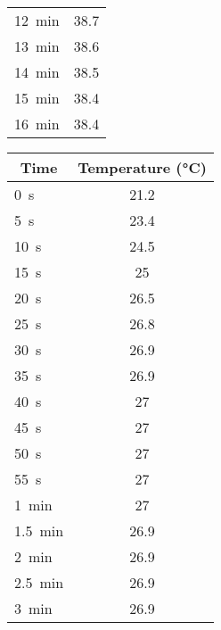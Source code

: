 \documentclass[11pt, titlepage]{article}
\begin{document}
\begin{center}
\begin{minipage}[t]{2in}
\begin{tabular}{l c}
                    \SI{12}{\minute} & 38.7 \\
                    \SI{13}{\minute} & 38.6 \\
                    \SI{14}{\minute} & 38.5 \\
                    \SI{15}{\minute} & 38.4 \\
                    \SI{16}{\minute} & 38.4 \\
                    \bottomrule
                \end{tabular}
            \end{minipage}
            \hspace{8pt}
            \begin{minipage}[t]{2in}
                \centering
                \label{tab:raw-partC}
                \begin{tabular}{l c}
                    \toprule
                    \multicolumn{1}{c}{Time} & Temperature (\si{\degreeCelsius}) \\
                    \midrule
                    \SI{0}{\second} & 21.2 \\
                    \SI{5}{\second} & 23.4 \\
                    \SI{10}{\second} & 24.5 \\
                    \SI{15}{\second} & 25 \\
                    \SI{20}{\second} & 26.5 \\
                    \SI{25}{\second} & 26.8 \\
                    \SI{30}{\second} & 26.9 \\
                    \SI{35}{\second} & 26.9 \\
                    \SI{40}{\second} & 27 \\
                    \SI{45}{\second} & 27 \\
                    \SI{50}{\second} & 27 \\
                    \SI{55}{\second} & 27 \\
                    \SI{1}{\minute} & 27 \\
                    \SI{1.5}{\minute} & 26.9 \\
                    \SI{2}{\minute} & 26.9 \\
                    \SI{2.5}{\minute} & 26.9 \\
                    \SI{3}{\minute} & 26.9 \\

\end{tabular}
\end{minipage}
\end{center}
\end{document}
